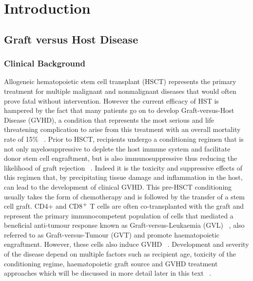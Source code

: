 
\chapter{Introduction} %

\label{Chapter1} %


\newcommand{\keyword}[1]{\textbf{#1}}
\newcommand{\tabhead}[1]{\textbf{#1}}
\newcommand{\code}[1]{\texttt{#1}}
\newcommand{\file}[1]{\texttt{\bfseries#1}}
\newcommand{\option}[1]{\texttt{\itshape#1}}

\section{Graft versus Host Disease}
\subsection{Clinical Background}

Allogeneic hematopoietic stem cell transplant (HSCT) represents the primary treatment for multiple malignant and nonmalignant diseases that would often prove fatal without intervention. However the current efficacy of HST is hampered by the fact that many patients go on to develop Graft-versus-Host Disease (GVHD), a condition that represents the most serious and life threatening complication to arise from this treatment with an overall mortality rate of 15\% ~\autocite{Fur2015, Bla2012}. Prior to HSCT, recipients undergo a conditioning regimen that is not only myelosuppressive to deplete the host immune system and facilitate donor stem cell engraftment, but is also immunosuppressive thus reducing the likelihood of graft rejection ~\autocite{Bla2012}. Indeed it is the toxicity and suppressive effects of this regimen that, by precipitating tissue damage and inflammation in the host, can lead to the development of clinical GVHD. This pre-HSCT conditioning usually takes the form of chemotherapy and is followed by the transfer of a stem cell graft. CD4+ and CD8$\textsuperscript{+}$ T cells are often co-transplanted with the graft and represent the primary immunocompetent population of cells that mediated a beneficial anti-tumour response known as Graft-versus-Leukaemia (GVL) ~\autocite{Pac2013}, also referred to as Graft-versus-Tumour (GVT) and promote haematopoietic engraftment. However, these cells also induce GVHD ~\autocite{Cha2007}. Development and severity of the disease depend on multiple factors such as recipient age, toxicity of the conditioning regime, haematopoietic graft source and GVHD treatment approaches which will be discussed in more detail later in this text ~\autocite{Bla2012}.

